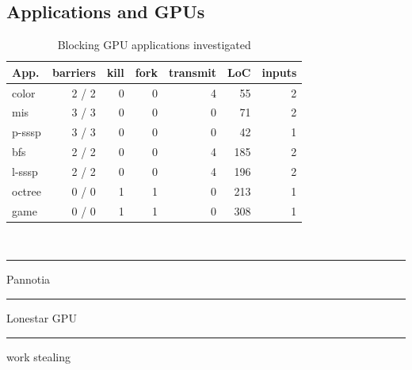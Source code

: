 \documentclass[sigconf]{acmart}
\newcommand\crule[3][black]{\textcolor{#1}{\rule{#2}{#3}}}
\begin{document}
{\subsection{Applications and GPUs}\label{sec:portingalgorithms}

\begin{table}[t]
\normalsize
\centering
\begin{tabular}{ l r r r r r r}
App. & barriers & kill & fork & transmit & LoC & inputs\\
\hline
\rowcolor{Gray1}
color & 2 / 2 & 0 & 0 & 4 & 55 & 2\\
\rowcolor{Gray1}
mis & 3 / 3 & 0 & 0 & 0 & 71 & 2\\
\rowcolor{Gray1}
p-sssp & 3 / 3 & 0 & 0 & 0  & 42 & 1\\
\rowcolor{Gray2}
bfs & 2 / 2 & 0 & 0  & 4  & 185 & 2\\
\rowcolor{Gray2}
l-sssp & 2 / 2 & 0 & 0  & 4  & 196 & 2\\
\rowcolor{Gray3}
octree & 0 / 0 & 1 & 1 & 0 & 213 & 1 \\
\rowcolor{Gray3}
game & 0 / 0 & 1 & 1 & 0 & 308 & 1 \\
\end{tabular} \\
\crule[Gray1]{.2cm}{.2cm} Pannotia \hspace{.4cm} \crule[Gray2]{.2cm}{.2cm} Lonestar GPU  \hspace{.4cm}  \crule[Gray3]{.2cm}{.2cm} work stealing
\caption{Blocking GPU applications investigated}
\label{tab:applications}
\end{table}


}
\end{document}
